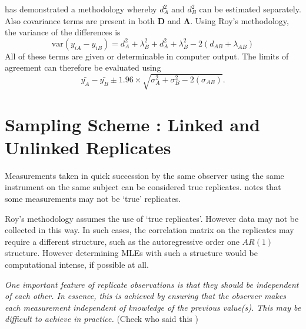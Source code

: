 \documentclass[12pt, a4paper]{report}
\theoremstyle{plain}
\theoremstyle{definition}
\theoremstyle{remark}
\begin{document}
\citet{ARoy2009} has demonstrated a methodology whereby $d^2_{A}$ and $d^2_{B}$ can be estimated separately. Also covariance terms are present in both $\boldsymbol{D}$ and $\boldsymbol{\Lambda}$. Using Roy's methodology, the variance of the differences is
\begin{equation}
\mbox{var} (y_{iA}-y_{iB})= d^2_{A} + \lambda^2_{B} + d^2_{A} + \lambda^2_{B} - 2(d_{AB} + \lambda_{AB})
\end{equation}
All of these terms are given or determinable in computer output.
The limits of agreement can therefore be evaluated using
\begin{equation}
\bar{y_{A}}-\bar{y_{B}} \pm 1.96 \times \sqrt{ \sigma^2_{A} + \sigma^2_{B}  - 2(\sigma_{AB})}.
\end{equation}




\newpage
	\section{Sampling Scheme : Linked and Unlinked Replicates}
	Measurements taken in quick succession by the same observer using the same instrument on the same subject can be considered true replicates. \citet{ARoy2009} notes that some measurements may not be `true' replicates.
	
	Roy's methodology assumes the use of `true replicates'. However data may not be collected in this way. In such cases, the correlation matrix on the replicates may require a different structure, such as the autoregressive order one $AR(1)$ structure. However determining MLEs with such a structure would be computational intense, if possible at all.
	
	
	
	\emph{
		One important feature of replicate observations is that they should be independent
		of each other. In essence, this is achieved by ensuring that the observer makes each
		measurement independent of knowledge of the previous value(s). This may be difficult
		to achieve in practice.} (Check who said this
	)
	
	
\end{document}
